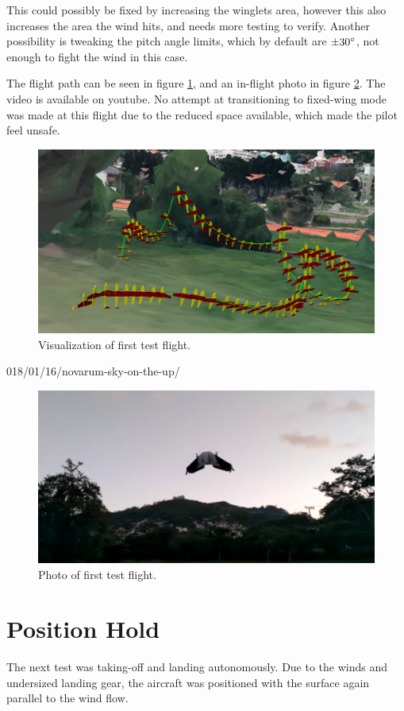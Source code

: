 This could possibly be fixed by increasing the winglets area, however this also increases the area the wind hits, and needs more testing to verify.
%
Another possibility is tweaking the pitch angle limits, which by default are $\pm 30\degree$, not enough to fight the wind in this case.

The flight path can be seen in figure \ref{fig:flight1-3d}, and an in-flight photo in figure \ref{fig:flight1-photo}. The video is available on youtube\cite{flight1}.
%
No attempt at transitioning to fixed-wing mode was made at this flight due to the reduced space available, which made the pilot feel unsafe.
	

\begin{figure}[H]
\centering
  \includegraphics[width=0.7\linewidth]{figs/flight1-3d.png}
  \caption{Visualization of first test flight.}
  \label{fig:flight1-3d}
\end{figure}018/01/16/novarum-sky-on-the-up/
	
	\begin{figure}[H]
\centering
  \includegraphics[width=0.7\linewidth]{figs/flight1-photo.png}
  \caption{Photo of first test flight.}
  \label{fig:flight1-photo}
\end{figure}
	



\section{Position Hold}
The next test was taking-off and landing autonomously. Due to the winds and undersized landing gear, the aircraft was positioned with the surface again parallel to the wind flow.

